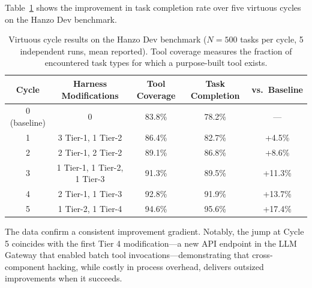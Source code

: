Table~\ref{tab:virtuous} shows the improvement in task completion rate over five
virtuous cycles on the Hanzo Dev benchmark.

\begin{table}[H]
\centering
\begin{tabular}{ccccc}
\toprule
Cycle & Harness Modifications & Tool Coverage & Task Completion & vs.\ Baseline \\
\midrule
0 (baseline) & 0 & 83.8\% & 78.2\% & --- \\
1 & 3 Tier-1, 1 Tier-2 & 86.4\% & 82.7\% & +4.5\% \\
2 & 2 Tier-1, 2 Tier-2 & 89.1\% & 86.8\% & +8.6\% \\
3 & 1 Tier-1, 1 Tier-2, 1 Tier-3 & 91.3\% & 89.5\% & +11.3\% \\
4 & 2 Tier-1, 1 Tier-3 & 92.8\% & 91.9\% & +13.7\% \\
5 & 1 Tier-2, 1 Tier-4 & 94.6\% & 95.6\% & +17.4\% \\
\bottomrule
\end{tabular}
\caption{Virtuous cycle results on the Hanzo Dev benchmark ($N=500$ tasks per cycle,
5 independent runs, mean reported). Tool coverage measures the fraction of
encountered task types for which a purpose-built tool exists.}
\label{tab:virtuous}
\end{table}

The data confirm a consistent improvement gradient. Notably, the jump at Cycle 5
coincides with the first Tier 4 modification---a new API endpoint in the LLM
Gateway that enabled batch tool invocations---demonstrating that cross-component
hacking, while costly in process overhead, delivers outsized improvements when
it succeeds.

